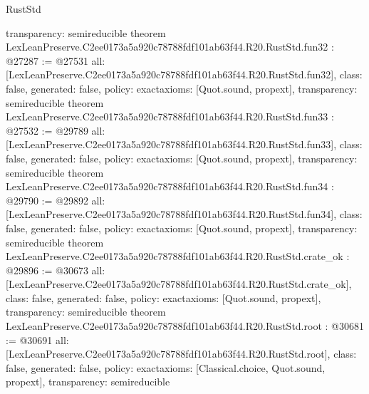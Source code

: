 \begin{lexlean}{RustStd}
\begin{coremodule}
{  transparency: semireducible
}
theorem LexLeanPreserve.C2ee0173a5a920c78788fdf101ab63f44.R20.RustStd.fun32 : @27287 := @27531 {
  all: [LexLeanPreserve.C2ee0173a5a920c78788fdf101ab63f44.R20.RustStd.fun32],
  class: false,
  generated: false,
  policy: exact{axioms: [Quot.sound, propext]},
  transparency: semireducible
}
theorem LexLeanPreserve.C2ee0173a5a920c78788fdf101ab63f44.R20.RustStd.fun33 : @27532 := @29789 {
  all: [LexLeanPreserve.C2ee0173a5a920c78788fdf101ab63f44.R20.RustStd.fun33],
  class: false,
  generated: false,
  policy: exact{axioms: [Quot.sound, propext]},
  transparency: semireducible
}
theorem LexLeanPreserve.C2ee0173a5a920c78788fdf101ab63f44.R20.RustStd.fun34 : @29790 := @29892 {
  all: [LexLeanPreserve.C2ee0173a5a920c78788fdf101ab63f44.R20.RustStd.fun34],
  class: false,
  generated: false,
  policy: exact{axioms: [Quot.sound, propext]},
  transparency: semireducible
}
theorem LexLeanPreserve.C2ee0173a5a920c78788fdf101ab63f44.R20.RustStd.crate_ok : @29896 := @30673 {
  all: [LexLeanPreserve.C2ee0173a5a920c78788fdf101ab63f44.R20.RustStd.crate_ok],
  class: false,
  generated: false,
  policy: exact{axioms: [Quot.sound, propext]},
  transparency: semireducible
}
theorem LexLeanPreserve.C2ee0173a5a920c78788fdf101ab63f44.R20.RustStd.root : @30681 := @30691 {
  all: [LexLeanPreserve.C2ee0173a5a920c78788fdf101ab63f44.R20.RustStd.root],
  class: false,
  generated: false,
  policy: exact{axioms: [Classical.choice, Quot.sound, propext]},
  transparency: semireducible
}


\end{coremodule}
\end{lexlean}
